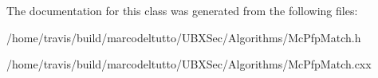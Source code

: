 The documentation for this class was generated from the following files\-:\begin{DoxyCompactItemize}
\item 
/home/travis/build/marcodeltutto/\-U\-B\-X\-Sec/\-Algorithms/Mc\-Pfp\-Match.\-h\item 
/home/travis/build/marcodeltutto/\-U\-B\-X\-Sec/\-Algorithms/Mc\-Pfp\-Match.\-cxx\end{DoxyCompactItemize}
